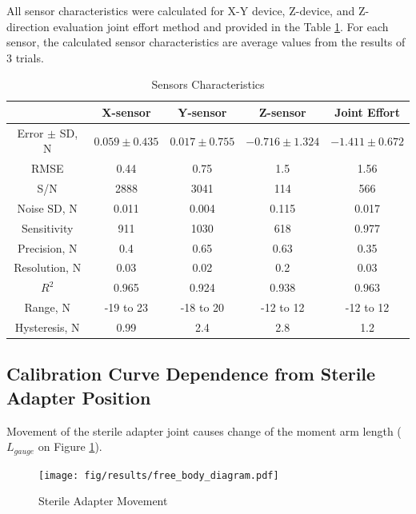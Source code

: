 All sensor characteristics were calculated for X-Y device, Z-device, and Z-direction evaluation joint effort method and provided in the Table \ref{tab:SenChar}. For each sensor, the calculated sensor characteristics are average values from the results of 3 trials.

\begin{table}[h]
\caption {Sensors Characteristics} \label{tab:SenChar} 
\begin{center}
\begin{tabular}{ | c | c | c | c | c | } 
\hline
 &  X-sensor & Y-sensor & Z-sensor & Joint Effort \\ 
\hline
Error $\pm$ SD, N & $0.059 \pm 0.435$ & $0.017 \pm 0.755$ & $-0.716 \pm 1.324$ & $-1.411 \pm 0.672$ \\ 
\hline
RMSE & 0.44 & 0.75 & 1.5 & 1.56 \\ 
\hline
S/N & 2888 & 3041 & 114 & 566 \\
\hline
Noise SD, N & 0.011 & 0.004 & 0.115 & 0.017 \\
\hline
Sensitivity & 911 & 1030 & 618 & 0.977 \\
\hline
Precision, N & 0.4 & 0.65 & 0.63 & 0.35 \\
\hline
Resolution, N & 0.03 & 0.02 & 0.2 & 0.03 \\
\hline
$R^2$ & 0.965 & 0.924 & 0.938 & 0.963 \\
\hline
Range, N & -19 to 23 & -18 to 20 & -12 to 12 & -12 to 12 \\
\hline
Hysteresis, N & 0.99 & 2.4 & 2.8 & 1.2 \\
\hline
\end{tabular}
\end{center}
\end{table}

\subsection{Calibration Curve Dependence from Sterile Adapter Position}
	\label{sec:DisExp}
	
Movement of the sterile adapter joint causes change of the moment arm length ($L_{gauge}$ on Figure \ref{fig:Free_Body_Diagram}).	 	

\begin{figure}[h]
	\begin{center}
	\texttt{[image: fig/results/free\_body\_diagram.pdf]}
	\end{center}
	\vspace{-4mm}
	\caption[Sterile Adapter Movement]
	{Sterile Adapter Movement}
	\label{fig:Free_Body_Diagram}
	\vspace{-2mm}
\end{figure}

